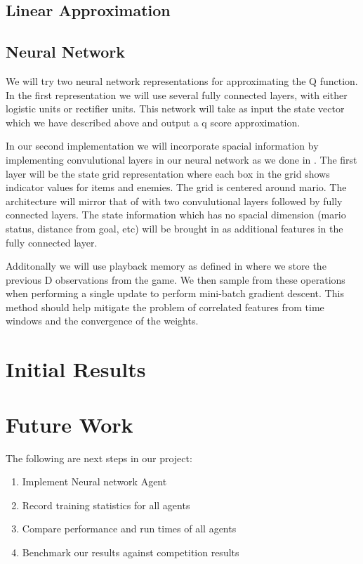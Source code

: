 \documentclass[12pt]{article}
\begin{document}
\subsection{Linear Approximation}

\subsection{Neural Network}

We will try two neural network representations for approximating the Q function. In the first representation we will use several fully connected layers, with either logistic units or rectifier units. This network will take as input the state vector which we have described above and output a q score approximation.

In our second implementation we will incorporate spacial information by implementing convulutional layers in our neural network as we done in \cite{mnih}. The first layer will be the state grid representation where each box in the grid shows indicator values for items and enemies. The grid is centered around mario. The architecture will mirror that of \cite{mnih} with two convulutional layers followed by fully connected layers. The state information which has no spacial dimension (mario status, distance from goal, etc) will be brought in as additional features in the fully connected layer.

Additonally we will use playback memory as defined in \cite{mnih} where we store the previous D observations from the game. We then sample from these operations when performing a single update to perform mini-batch gradient descent. This method should help mitigate the problem of correlated features from time windows and the convergence of the weights.

\section{Initial Results}



\section{Future Work}

The following are next steps in our project:

\begin{enumerate}
\item Implement Neural network Agent
\item Record training statistics for all agents
\item Compare performance and run times of all agents
\item Benchmark our results against competition results
\end{enumerate}
\end{document}
